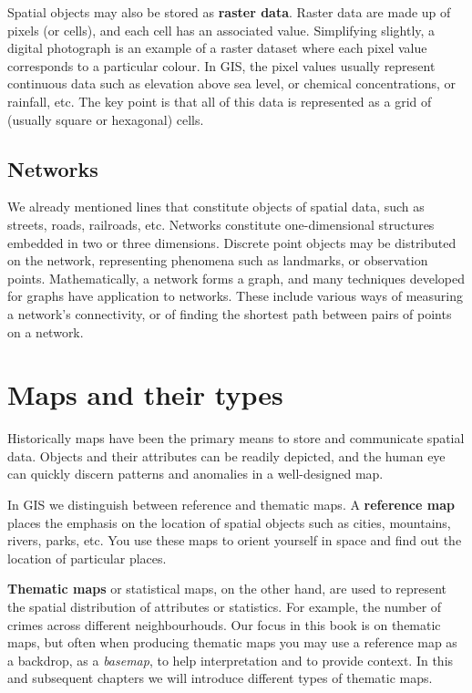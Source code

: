 \documentclass[
]{book}
\begin{document}
Spatial objects may also be stored as \textbf{raster data}. Raster data are made up of pixels (or cells), and each cell has an associated value. Simplifying slightly, a digital photograph is an example of a raster dataset where each pixel value corresponds to a particular colour. In GIS, the pixel values usually represent continuous data such as elevation above sea level, or chemical concentrations, or rainfall, etc. The key point is that all of this data is represented as a grid of (usually square or hexagonal) cells.

\hypertarget{networks}{%
\subsection{Networks}\label{networks}}

We already mentioned lines that constitute objects of spatial data, such as streets, roads, railroads, etc. Networks constitute one-dimensional structures embedded in two or three dimensions. Discrete point objects may be distributed on the network, representing phenomena such as landmarks, or observation points. Mathematically, a network forms a graph, and many techniques developed for graphs have application to networks. These include various ways of measuring a network's connectivity, or of finding the shortest path between pairs of points on a network.

\hypertarget{maps-and-their-types}{%
\section{Maps and their types}\label{maps-and-their-types}}

Historically maps have been the primary means to store and communicate spatial data. Objects and their attributes can be readily depicted, and the human eye can quickly discern patterns and anomalies in a well-designed map.

In GIS we distinguish between reference and thematic maps. A \textbf{reference map} places the emphasis on the location of spatial objects such as cities, mountains, rivers, parks, etc. You use these maps to orient yourself in space and find out the location of particular places.

\textbf{Thematic maps} or statistical maps, on the other hand, are used to represent the spatial distribution of attributes or statistics. For example, the number of crimes across different neighbourhouds. Our focus in this book is on thematic maps, but often when producing thematic maps you may use a reference map as a backdrop, as a \emph{basemap}, to help interpretation and to provide context. In this and subsequent chapters we will introduce different types of thematic maps.
\end{document}
